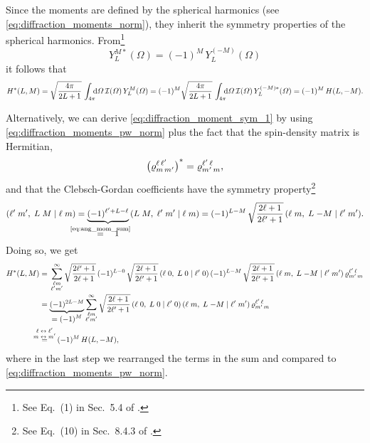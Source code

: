 Since the moments are defined by the spherical harmonics (see
\cref{eq:diffraction_moments_norm}), they inherit the symmetry properties
of the spherical harmonics.  From\footnote{See Eq.~(1) in Sec.~5.4 of
.}
\begin{equation}
  \label{eq:spherical_harm_sym}
  Y_L^{M *}(\Omega)
  = (-1)^M\, Y_L^{(-M)}(\Omega)
\end{equation}
it follows that
\begin{equation}
  \label{eq:diffraction_moment_sym_1}
  H^*(L, M)
  = \sqrt{\frac{4 \pi}{2 L + 1}}\, \int_{4 \pi}\!\!\! \dif{\Omega}\, \mathcal{I}(\Omega)\, Y_L^M(\Omega)
  = (-1)^M \sqrt{\frac{4 \pi}{2 L + 1}}\, \int_{4 \pi}\!\!\! \dif{\Omega}\, \mathcal{I}(\Omega)\, Y_L^{(-M) *}(\Omega)
  = (-1)^M\, H(L, -M).
\end{equation}

Alternatively, we can derive \cref{eq:diffraction_moment_sym_1} by
using \cref{eq:diffraction_moments_pw_norm} plus the fact that the
spin-density matrix is Hermitian,
\ie
\begin{equation}
  \rBrk[1]{\varrho^{\ell\, \ell'}_{m\, m'}}^*
  = \varrho^{\ell'\, \ell}_{m'\, m},
\end{equation}
and that the Clebsch-Gordan coefficients have the symmetry
property\footnote{See Eq.~(10) in Sec.~8.4.3 of
.}
\begin{equation}
  \label{eq:clebsch_sym}
  \clebsch{\ell'}{m'}{L}{M}{\ell}{m}
  = \cdUnderbrace{(-1)^{\ell' + L - \ell}}{\equalUsing{$\mathclap{\text{\cref{eq:ang_mom_sum}}}$}\quad 1}\,
  \clebsch{L}{M}{\ell'}{m'}{\ell}{m}
  = (-1)^{L - M}\, \sqrt{\frac{2 \ell + 1}{2 \ell' + 1}}\, \clebsch{\ell}{m}{L}{-M}{\ell'}{m'}.
\end{equation}
Doing so, we get
\begin{align}
  H^*(L, M)
  ={}& \sum_{\substack{\ell m \\ \ell' m'}}^\infty
    \sqrt{\frac{2 \ell' + 1}{2 \ell + 1}}\,
    (-1)^{L - 0}\, \sqrt{\frac{2 \ell + 1}{2 \ell' + 1}}\, \clebsch{\ell}{0}{L}{0}{\ell'}{0}\,
    (-1)^{L - M}\, \sqrt{\frac{2 \ell + 1}{2 \ell' + 1}}\, \clebsch{\ell}{m}{L}{-M}{\ell'}{m'}\,
    \varrho^{\ell'\, \ell}_{m'\, m} \notag
  \\
  ={}& \dUnderbrace{(-1)^{2 L - M}}{= (-1)^M}
  \sum_{\substack{\ell m \\ \ell' m'}}^\infty
  \sqrt{\frac{2 \ell + 1}{2 \ell' + 1}}\,
  \clebsch{\ell}{0}{L}{0}{\ell'}{0}\, \clebsch{\ell}{m}{L}{-M}{\ell'}{m'}\,
  \varrho^{\ell'\, \ell}_{m'\, m}
  \\
  \equalUsing{$\mathclap{\substack{\displaystyle{\ell \leftrightarrow \ell'} \\ \displaystyle{m \leftrightarrow m'}}}$}{}& \quad
  (-1)^M\, H(L, -M),
\end{align}
where in the last step we rearranged the terms in the sum and compared
to \cref{eq:diffraction_moments_pw_norm}.

